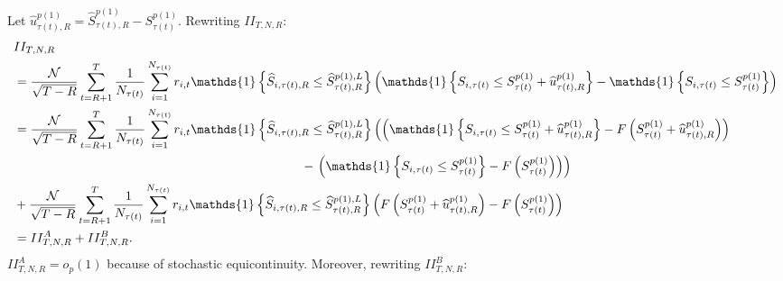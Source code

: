 Let $\widehat{u}_{\tau(t),R}^{p(1)}=\widehat{S}_{\tau(t),R}^{p(1)}-S_{\tau(t)}^{p(1)}$. Rewriting $II_{T,N,R}$:
\begin{align*}
    &II_{T,N,R} \\
    &=\frac{\mathcal{N}}{\sqrt{T-R}}\sum_{t=R+1}^{T}\frac{1}{N_{\tau(t)}}\sum_{i=1}^{N_{\tau(t)}}r_{i,t} \mathds{1} \left\{ \widehat{S}_{i,\tau(t),R}\leq \widehat{S}_{\tau(t),R}^{p(1),L}\right\} \left( \mathds{1} \left\{ S_{i,\tau(t)}\leq S_{\tau(t)}^{p(1)}+\widehat{u}_{\tau(t),R}^{p(1)}\right\} -\mathds{1} \left\{ S_{i,\tau(t)}\leq S_{\tau(t)}^{p(1)}\right\} \right) \\
    &=\frac{\mathcal{N}}{\sqrt{T-R}}\sum_{t=R+1}^{T}\frac{1}{N_{\tau(t)}}\sum_{i=1}^{N_{\tau(t)}}r_{i,t}\mathds{1} \left\{ \widehat{S}_{i,\tau(t),R}\leq \widehat{S}_{\tau(t),R}^{p(1),L}\right\} \left( \left( \mathds{1} \left\{ S_{i,\tau(t)}\leq S_{\tau(t)}^{p(1)}+\widehat{u}_{\tau(t),R}^{p(1)}\right\} -F\left( S_{\tau(t)}^{p(1)}+\widehat{u}_{\tau(t),R}^{p(1)}\right) \right) \right. \\
    &\hspace{8.cm}- \left. \left( \mathds{1} \left\{ S_{i,\tau(t)}\leq S_{\tau(t)}^{p(1)}\right\} -F\left(S_{\tau(t)}^{p(1)}\right)\right) \right) \\
    &+\frac{\mathcal{N}}{\sqrt{T-R}}\sum_{t=R+1}^{T}\frac{1}{N_{\tau(t)}}\sum_{i=1}^{N_{\tau(t)}}r_{i,t}\mathds{1} \left\{ \widehat{S}_{i,\tau(t),R}\leq \widehat{S}_{\tau(t),R}^{p(1),L}\right\} \left( F\left( S_{\tau(t)}^{p(1)}+\widehat{u}_{\tau(t),R}^{p(1)}\right) -F\left( S_{\tau(t)}^{p(1)}\right) \right) \\
    &= II_{T,N,R}^A + II_{T,N,R}^B.
\end{align*}
$II_{T,N,R}^A = o_p(1)$ because of stochastic equicontinuity. Moreover, rewriting $II_{T,N,R}^B$:
